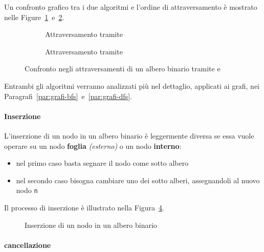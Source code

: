\documentclass[italian, 10pt]{article}
\begin{document}
\bigskip
Un confronto grafico tra i due algoritmi e l'ordine di attraversamento è mostrato nelle Figure~\ref{fig:attraversamento-albero-bfs}~e~\ref{fig:attraversamento-albero-dfs}.

\begin{figure}
  \bigskip
  \centering
  \begin{subfigure}[t]{0.45\textwidth}
    \centering
    \caption{Attraversamento tramite \BFS}
    \label{fig:attraversamento-albero-bfs}
  \end{subfigure}
  \begin{subfigure}[t]{0.45\textwidth}
    \centering
    \caption{Attraversamento tramite \DFS}
    \label{fig:attraversamento-albero-dfs}
  \end{subfigure}
  \caption{Confronto negli attraversamenti di un albero binario tramite \BFS e \DFS}
  \label{fig:confronto-attraversamento-bfs-dfs}
  \bigskip
\end{figure}

\bigskip
Entrambi gli algoritmi verranno analizzati più nel dettaglio, applicati ai grafi, nei Paragrafi~\ref{par:grafi-bfs}~e~\ref{par:grafi-dfs}.

\paragraph{Inserzione}
\label{par:inserzione-albero-binario}

L'inserzione di un nodo in un albero binario è leggermente diversa se essa vuole operare su un nodo \textbf{foglia} \textit{(esterno)} o un nodo \textbf{interno}:

\begin{itemize}
  \item nel primo caso basta segnare il nodo come sotto albero
  \item nel secondo caso bisogna cambiare uno dei sotto alberi, assegnandoli al nuovo nodo \texttt{n}
\end{itemize}

\bigskip
Il processo di inserzione è illustrato nella Figura~\ref{fig:inserzione-albero-binario}.

\begin{figure}[htbp]
  \bigskip
  \centering
  \caption{Inserzione di un nodo in un albero binario}
  \label{fig:inserzione-albero-binario}
  \bigskip
\end{figure}

\paragraph{cancellazione}
\label{par:cancellazione-albero-binario}
\end{document}
